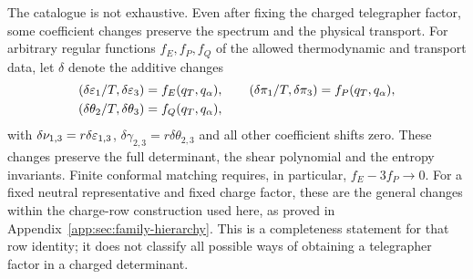 The catalogue is not exhaustive. Even after fixing the charged telegrapher
factor, some coefficient changes preserve the spectrum and the physical
transport. For arbitrary regular functions $f_E,f_P,f_Q$ of the allowed
thermodynamic and transport data, let $\delta$ denote the additive changes
\begin{equation}\label{eq:free-shifts}
 \begin{split}
 (\delta\varepsilon_1/T,\delta\varepsilon_3)&=f_E(q_T,q_\alpha),\qquad
 (\delta\pi_1/T,\delta\pi_3)=f_P(q_T,q_\alpha),\\
 (\delta\theta_2/T,\delta\theta_3)&=f_Q(q_T,q_\alpha),
 \end{split}
\end{equation}
with $\delta\nu_{1,3}=r\delta\varepsilon_{1,3}$,
$\delta\gamma_{2,3}=r\delta\theta_{2,3}$ and all other coefficient shifts zero.
These changes preserve the full determinant, the shear polynomial and the
entropy invariants. Finite conformal matching requires, in particular,
$f_E-3f_P\to0$. For a fixed neutral representative and fixed charge factor,
these are the general changes within the charge-row construction used
here, as proved in Appendix~\ref{app:sec:family-hierarchy}. This is a
completeness statement for that row identity; it does not classify all
possible ways of obtaining a telegrapher factor in a charged determinant.

